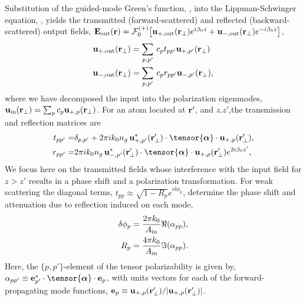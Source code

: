 \documentclass[preprint,aps,pra,onecolumn]{revtex4-1} %
\newcommand{\out}{{\rm out}}
\newcommand{\fwd}{+}
\newcommand{\bwd}{-}
\newcommand{\trans}{+}
\newcommand{\refl}{-}
\newcommand{\Eamp}{\mathcal{F}_0^{(+)}}
\begin{document}
Substitution of the guided-mode Green's function, , into the Lippman-Schwinger equation, , yields the transmitted (forward-scattered) and reflected (backward-scattered) output fields, $\mathbf{E}_{\out}(\br) = \Eamp \big[ \mathbf{u}_{\trans, \out} (\br_\perp) e^{i \beta_0 z} + \mathbf{u}_{\refl,\out} (\br_\perp) e^{-i \beta_0 z} \big]$, 
	\begin{align}
		\mathbf{u}_{\trans, \out} (\br_\perp) &=  \sum_{p,p'}  \, c_{p} t_{pp'} \mathbf{u}_{\fwd, p'}(\br_\perp) \\ 
		\mathbf{u}_{\refl,\out} (\br_\perp) &=  \sum_{p,p'}  \, c_{p} r_{pp'} \mathbf{u}_{\bwd, p'}(\br_\perp),
	\end{align}
where we have decomposed the input into the polarization eigenmodes, $\mbf{u}_{\rm in}(\mbf{r}_\perp) = \sum_{p} c_{p} \mathbf{u}_{\fwd,p}(\br_\perp)$.  For an atom located at $\mathbf{r}'$,  and $z.z'$,the transmission and reflection matrices are 
	\begin{align} \label{Eq::PolarizationTransformation}
		t_{pp'} =& \delta_{p,p'} +  2\pi i k_0 n_g \, \mathbf{u}^*_{+, p'}(\br'_\perp) \cdot 
\tensor{\boldsymbol{\alpha}} \cdot \mathbf{u}_{+, p}(\br'_\perp) , \\
		r_{pp'} =&  2\pi i k_0 n_g \, \mathbf{u}^*_{\bwd, p'}(\br'_\perp) \cdot 
\tensor{\boldsymbol{\alpha}} \cdot \mathbf{u}_{\fwd, p}(\br'_\perp) e^{2 i\beta_0 z'} , 
	\end{align} 
We focus here on the transmitted fields whose interference with the input field for $z>z'$ results in a phase shift and a polarization transformation.  For weak scattering the diagonal terms, $t_{p p} \approx \sqrt{1-R_p}e^{i \delta \phi_p}$, determine the phase shift and attenuation due to reflection induced on each mode,
	\begin{align}
		 \delta \phi_p &= \frac{2 \pi k_0}{A_{\rm in}} \Re(\alpha_{pp}),  \label{Eq::PhaseShift} \\
		R_p &=  \frac{4 \pi k_0}{A_{\rm in}} \Im(\alpha_{pp}) .\label{Eq::Attenuation} 
	\end{align} 
Here, the $\{p,p'\}$-element of the tensor polarizability is given by, $\alpha_{pp'} \equiv \mathbf{e}^*_{p'} \cdot \tensor{\boldsymbol{\alpha}}\cdot \mathbf{e}_{p}$, with units vectors for each of the forward-propagating mode functions, $\mathbf{e}_{p}\equiv \mathbf{u}_{+,p}(\mathbf{r}'_\perp)/|\mathbf{u}_{+,p}(\mathbf{r}'_\perp)|$. 
\end{document}
